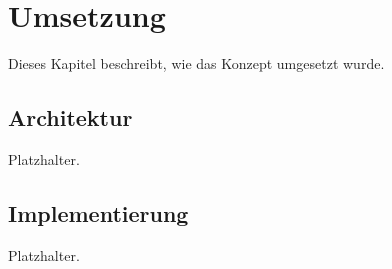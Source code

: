 
\chapter{Umsetzung}\label{ch:umsetzung}

Dieses Kapitel beschreibt, wie das Konzept umgesetzt wurde.

\section{Architektur}\label{sec:architektur}

Platzhalter.

\section{Implementierung}\label{sec:implementierung}

Platzhalter.
